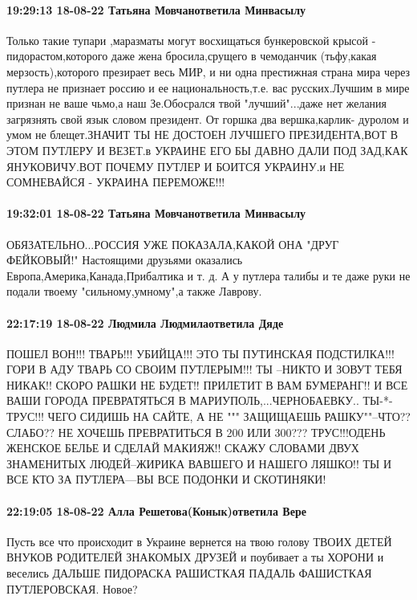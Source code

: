 \paragraph{19:29:13 18-08-22 Татьяна Мовчанответила Минвасылу}

Только такие тупари ,маразматы могут восхищаться бункеровской крысой -
пидорастом,которого даже жена бросила,срущего в чемоданчик (тьфу,какая
мерзость),которого презирает весь МИР, и ни одна престижная страна мира через
путлера не признает россию и ее национальность,т.е. вас русских.Лучшим в мире
признан не ваше чьмо,а наш Зе.Обосрался твой "лучший"...даже нет желания
загрязнять свой язык словом президент. От горшка два вершка,карлик- дуролом и
умом не блещет.ЗНАЧИТ ТЫ НЕ ДОСТОЕН ЛУЧШЕГО ПРЕЗИДЕНТА,ВОТ В ЭТОМ ПУТЛЕРУ И
ВЕЗЕТ.в УКРАИНЕ ЕГО БЫ ДАВНО ДАЛИ ПОД ЗАД,КАК ЯНУКОВИЧУ.ВОТ ПОЧЕМУ ПУТЛЕР И
БОИТСЯ УКРАИНУ.и НЕ СОМНЕВАЙСЯ - УКРАИНА  ПЕРЕМОЖЕ!!!

\paragraph{19:32:01 18-08-22 Татьяна Мовчанответила Минвасылу}

ОБЯЗАТЕЛЬНО...РОССИЯ УЖЕ ПОКАЗАЛА,КАКОЙ ОНА "ДРУГ ФЕЙКОВЫЙ!" Настоящими
друзьями оказались Европа,Америка,Канада,Прибалтика и т. д. А у путлера талибы
и те даже руки не подали твоему "сильному,умному",а также Лаврову.

\paragraph{22:17:19 18-08-22 Людмила Людмилаответила Дяде}

ПОШЕЛ ВОН!!! ТВАРЬ!!! УБИЙЦА!!! ЭТО ТЫ ПУТИНСКАЯ ПОДСТИЛКА!!! ГОРИ В АДУ ТВАРЬ
СО СВОИМ ПУТЛЕРЫМ!!! ТЫ --НИКТО И ЗОВУТ ТЕБЯ НИКАК!! СКОРО РАШКИ НЕ БУДЕТ!!
ПРИЛЕТИТ В ВАМ БУМЕРАНГ!! И ВСЕ ВАШИ ГОРОДА ПРЕВРАТЯТЬСЯ В
МАРИУПОЛЬ,...ЧЕРНОБАЕВКУ.. ТЫ-*-ТРУС!!! ЧЕГО СИДИШЬ НА САЙТЕ, А НЕ """
ЗАЩИЩАЕШЬ РАШКУ""--ЧТО?? СЛАБО?? НЕ ХОЧЕШЬ ПРЕВРАТИТЬСЯ В 200 ИЛИ 300???
ТРУС!!!ОДЕНЬ ЖЕНСКОЕ БЕЛЬЕ И СДЕЛАЙ МАКИЯЖ!! СКАЖУ СЛОВАМИ ДВУХ ЗНАМЕНИТЫХ
ЛЮДЕЙ--ЖИРИКА ВАВШЕГО И НАШЕГО ЛЯШКО!! ТЫ И ВСЕ КТО ЗА ПУТЛЕРА---ВЫ ВСЕ ПОДОНКИ
И СКОТИНЯКИ!

\paragraph{22:19:05 18-08-22 Алла Решетова(Конык)ответила Вере}

Пусть все что происходит в Украине вернется на твою голову ТВОИХ ДЕТЕЙ ВНУКОВ
РОДИТЕЛЕЙ ЗНАКОМЫХ ДРУЗЕЙ и поубивает а ты ХОРОНИ и веселись ДАЛЬШЕ ПИДОРАСКА
РАШИСТКАЯ ПАДАЛЬ ФАШИСТКАЯ ПУТЛЕРОВСКАЯ.
Новое?

